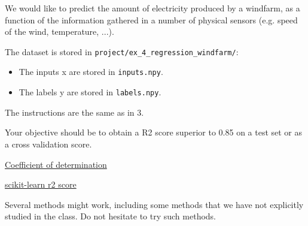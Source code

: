 \documentclass[10pt, a4paper]{article}
\begin{document}
\begin{Problem}
    We would like to predict the amount of electricity produced by a windfarm, as a function of the information gathered in a number of physical sensors (e.g. speed of the wind, temperature, ...).

    The dataset is stored in \verb|project/ex_4_regression_windfarm/|:
    \begin{itemize}
        \item The inputs x are stored in \verb|inputs.npy|.
        \item The labels y are stored in \verb|labels.npy|.
    \end{itemize}

    The instructions are the same as in 3.

    Your objective should be to obtain a R2 score superior to 0.85 on a test set or as a cross validation score.

    \href{https://fr.wikipedia.org/wiki/Coefficient_de_d%C3%A9termination}{Coefficient of determination}

    \href{https://scikit-learn.org/stable/modules/generated/sklearn.metrics.r2_score.html}{scikit-learn r2 score}

    Several methods might work, including some methods that we have not explicitly studied in the class. Do not hesitate to try such methods.
\end{Problem}
\end{document}
